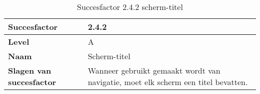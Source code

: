 \begin{table}[H]
    \centering
    \caption{Succesfactor 2.4.2 scherm-titel}
    
    
    \hspace*{-1cm}\begin{tabular}{|l|p{12cm}|} 
        \hline
        \textbf{Succesfactor}                 & 2.4.2                                                                                                                                                                                                                                                                                                                                                                                                                                                                                                          \\ 
        \hline
        \textbf{Level}                        & A                                                                                                                                                                                                                                                                                                                                                                                                                                                                                                                 \\ 
        \hline
        \textbf{Naam}                         & Scherm-titel~                                                                                                                                                                                                                                                                                                                                                                                                                                                                                      \\ 
        \hline
        \textbf{Slagen van succesfactor}      & Wanneer gebruikt gemaakt wordt van navigatie, moet elk scherm een titel bevatten.                                                                                                                                  \\ 
     

\end{tabular}
\end{table}
